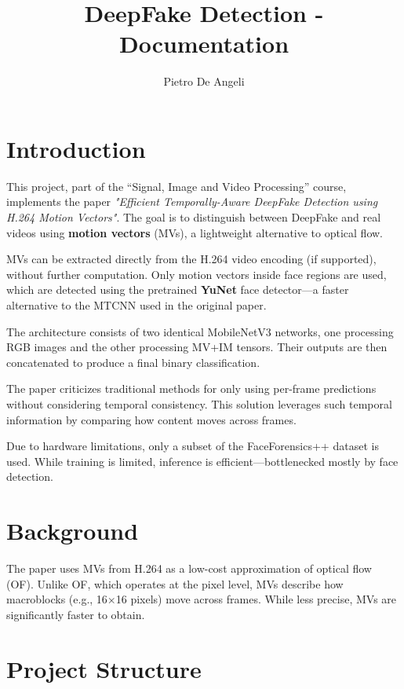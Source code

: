 \documentclass[a4paper,12pt]{article}
\title{DeepFake Detection - Documentation}
\author{Pietro De Angeli}
\begin{document}
\maketitle
\tableofcontents
\newpage

\section{Introduction}

This project, part of the “Signal, Image and Video Processing” course, implements the paper \emph{"Efficient Temporally-Aware DeepFake Detection using H.264 Motion Vectors"}. The goal is to distinguish between DeepFake and real videos using \textbf{motion vectors} (MVs), a lightweight alternative to optical flow.

MVs can be extracted directly from the H.264 video encoding (if supported), without further computation. Only motion vectors inside face regions are used, which are detected using the pretrained \textbf{YuNet} face detector—a faster alternative to the MTCNN used in the original paper.

The architecture consists of two identical MobileNetV3 networks, one processing RGB images and the other processing MV+IM tensors. Their outputs are then concatenated to produce a final binary classification.

The paper criticizes traditional methods for only using per-frame predictions without considering temporal consistency. This solution leverages such temporal information by comparing how content moves across frames.

Due to hardware limitations, only a subset of the FaceForensics++ dataset is used. While training is limited, inference is efficient—bottlenecked mostly by face detection.

\section{Background}

The paper uses MVs from H.264 as a low-cost approximation of optical flow (OF). Unlike OF, which operates at the pixel level, MVs describe how macroblocks (e.g., 16×16 pixels) move across frames. While less precise, MVs are significantly faster to obtain.

\section{Project Structure}
\end{document}
